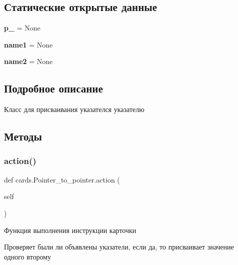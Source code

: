 \subsection*{Статические открытые данные}
\begin{DoxyCompactItemize}
\item 
\mbox{\label{classcards_1_1_pointer__to__pointer_aee95a32769e8d2f8e7d4d0af13529f1f}} 
{\bfseries p\+\_} = None
\item 
\mbox{\label{classcards_1_1_pointer__to__pointer_a1366d7e1fd05f0e2b5baf1134c19a136}} 
{\bfseries name1} = None
\item 
\mbox{\label{classcards_1_1_pointer__to__pointer_acff6d1894b071f2425b03b3244855ad7}} 
{\bfseries name2} = None
\end{DoxyCompactItemize}


\subsection{Подробное описание}
Класс для присваивания указателся указателю 



\subsection{Методы}
\mbox{\label{classcards_1_1_pointer__to__pointer_a233d4b2b07faa521173760898cce72be}} 
\subsubsection{\texorpdfstring{action()}{action()}}
{\footnotesize\ttfamily def cards.\+Pointer\+\_\+to\+\_\+pointer.\+action (\begin{DoxyParamCaption}\item[{}]{self }\end{DoxyParamCaption})}



Функция выполнения инструкции карточки 

Проверяет были ли объявлены указатели, если да, то присваивает значение одного второму \mbox{\label{classcards_1_1_pointer__to__pointer_a4c313ca253c448ba0cb85f7688bc7dd1}} 
